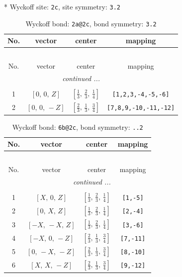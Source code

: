 \documentclass[fleqn,8pt]{jsarticle}
\begin{document}
* Wyckoff site: {\tt 2c}, site symmetry: {\tt 3.2}
\renewcommand{\arraystretch}{1.2}
\begin{longtable}{cccc}
\caption{Wyckoff bond: {\tt 2a@2c}, bond symmetry: {\tt 3.2}}
 \\
 \hline \hline
No. & vector & center & mapping \\ \hline \endfirsthead

\multicolumn{3}{l}{\tablename\ \thetable{}} \\
 \hline \hline
No. & vector & center & mapping \\ \hline \endhead

 \hline \hline
\multicolumn{3}{r}{\footnotesize\it continued ...} \\ \endfoot

 \hline \hline
\multicolumn{3}{r}{} \\ \endlastfoot

1 & $\left[ 0,\, 0,\, Z \right]$ & $\left[ \frac{1}{3},\, \frac{2}{3},\, \frac{1}{4} \right]$ & {\tt [1,2,3,-4,-5,-6]} \\ \hline
2 & $\left[ 0,\, 0,\, - Z \right]$ & $\left[ \frac{2}{3},\, \frac{1}{3},\, \frac{3}{4} \right]$ & {\tt [7,8,9,-10,-11,-12]} \\
\end{longtable}
\renewcommand{\arraystretch}{1.2}
\begin{longtable}{cccc}
\caption{Wyckoff bond: {\tt 6b@2c}, bond symmetry: {\tt ..2}}
 \\
 \hline \hline
No. & vector & center & mapping \\ \hline \endfirsthead

\multicolumn{3}{l}{\tablename\ \thetable{}} \\
 \hline \hline
No. & vector & center & mapping \\ \hline \endhead

 \hline \hline
\multicolumn{3}{r}{\footnotesize\it continued ...} \\ \endfoot

 \hline \hline
\multicolumn{3}{r}{} \\ \endlastfoot

1 & $\left[ X,\, 0,\, Z \right]$ & $\left[ \frac{1}{3},\, \frac{2}{3},\, \frac{1}{4} \right]$ & {\tt [1,-5]} \\ \hline
2 & $\left[ 0,\, X,\, Z \right]$ & $\left[ \frac{1}{3},\, \frac{2}{3},\, \frac{1}{4} \right]$ & {\tt [2,-4]} \\ \hline
3 & $\left[ - X,\, - X,\, Z \right]$ & $\left[ \frac{1}{3},\, \frac{2}{3},\, \frac{1}{4} \right]$ & {\tt [3,-6]} \\ \hline
4 & $\left[ - X,\, 0,\, - Z \right]$ & $\left[ \frac{2}{3},\, \frac{1}{3},\, \frac{3}{4} \right]$ & {\tt [7,-11]} \\ \hline
5 & $\left[ 0,\, - X,\, - Z \right]$ & $\left[ \frac{2}{3},\, \frac{1}{3},\, \frac{3}{4} \right]$ & {\tt [8,-10]} \\ \hline
6 & $\left[ X,\, X,\, - Z \right]$ & $\left[ \frac{2}{3},\, \frac{1}{3},\, \frac{3}{4} \right]$ & {\tt [9,-12]} \\
\end{longtable}
\end{document}

